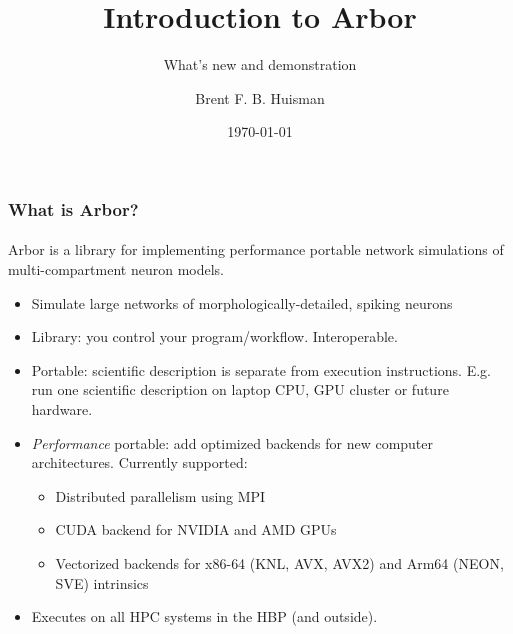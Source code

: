 \documentclass[t]{beamer}
\title{Introduction to Arbor}
\subtitle{What's new and demonstration}
\author{Brent F. B. Huisman}
\institute{Jülich Supercomputing Centre}
\date{\today}
\begin{document}
\maketitle

\small

\begin{frame}
    \frametitle{What is Arbor?}
    \framesubtitle{}
        Arbor is a library for implementing performance portable network simulations of multi-compartment neuron models.

        \begin{itemize}
        \item Simulate large networks of morphologically-detailed, spiking neurons
        \item Library: you control your program/workflow. Interoperable.
        \item Portable: scientific description is separate from execution instructions. E.g. run one scientific description on laptop CPU, GPU cluster or future hardware.
        \item \textit{Performance} portable: add optimized backends for new computer architectures. Currently supported:
            \begin{itemize}
            \item Distributed parallelism using MPI
            \item CUDA backend for NVIDIA and AMD GPUs
            \item Vectorized backends for x86-64 (KNL, AVX, AVX2) and Arm64 (NEON, SVE) intrinsics
            \end{itemize}
        \item Executes on all HPC systems in the HBP (and outside).
        \end{itemize}
\end{frame}
\end{document}
